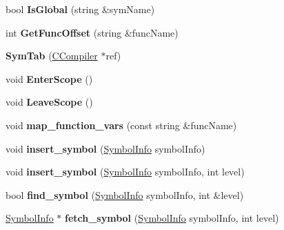 \begin{DoxyCompactItemize}
\item 
\hypertarget{classSymTab_a4c4699d90ffd605b205e9e94be9eacde}{bool {\bfseries Is\-Global} (string \&sym\-Name)}\label{classSymTab_a4c4699d90ffd605b205e9e94be9eacde}

\item 
\hypertarget{classSymTab_a793c31d247f484b04a9283e71f172756}{int {\bfseries Get\-Func\-Offset} (string \&func\-Name)}\label{classSymTab_a793c31d247f484b04a9283e71f172756}

\item 
\hypertarget{classSymTab_a20c7b65c7ffb728fa792e87258d381a2}{{\bfseries Sym\-Tab} (\hyperlink{classCCompiler}{C\-Compiler} $\ast$ref)}\label{classSymTab_a20c7b65c7ffb728fa792e87258d381a2}

\item 
\hypertarget{classSymTab_af335dd1ba840dfab4219856545d5d8ef}{void {\bfseries Enter\-Scope} ()}\label{classSymTab_af335dd1ba840dfab4219856545d5d8ef}

\item 
\hypertarget{classSymTab_afd2c44208cdad3ddfc85136136cd27c3}{void {\bfseries Leave\-Scope} ()}\label{classSymTab_afd2c44208cdad3ddfc85136136cd27c3}

\item 
\hypertarget{classSymTab_aaca51de0935bbdbf3fdf434deccccb92}{void {\bfseries map\-\_\-function\-\_\-vars} (const string \&func\-Name)}\label{classSymTab_aaca51de0935bbdbf3fdf434deccccb92}

\item 
\hypertarget{classSymTab_ad8e59e29c50f039570c5844871bf838c}{void {\bfseries insert\-\_\-symbol} (\hyperlink{structSymbolInfo}{Symbol\-Info} symbol\-Info)}\label{classSymTab_ad8e59e29c50f039570c5844871bf838c}

\item 
\hypertarget{classSymTab_a8372047f573c6d84fa231aa7e9842280}{void {\bfseries insert\-\_\-symbol} (\hyperlink{structSymbolInfo}{Symbol\-Info} symbol\-Info, int level)}\label{classSymTab_a8372047f573c6d84fa231aa7e9842280}

\item 
\hypertarget{classSymTab_a2aedd91e00780c889e60a60fc0795daf}{bool {\bfseries find\-\_\-symbol} (\hyperlink{structSymbolInfo}{Symbol\-Info} symbol\-Info, int \&level)}\label{classSymTab_a2aedd91e00780c889e60a60fc0795daf}

\item 
\hypertarget{classSymTab_ac0bfd9c56cfd8e697046178629adbebc}{\hyperlink{structSymbolInfo}{Symbol\-Info} $\ast$ {\bfseries fetch\-\_\-symbol} (\hyperlink{structSymbolInfo}{Symbol\-Info} symbol\-Info, int level)}\label{classSymTab_ac0bfd9c56cfd8e697046178629adbebc}


\end{DoxyCompactItemize}
